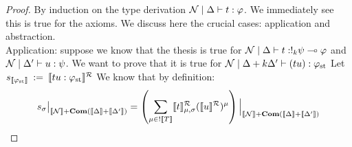 	\begin{proof}
		By induction on the type derivation $\mathcal{N}\mid\Delta\vdash t:\varphi$. We immediately see this is true for the axioms. We discuss here the crucial cases: application and abstraction.\\ 
		Application: suppose we know that the thesis is true for $\mathcal{N}\mid\Delta\vdash t:!_k \psi \multimap \varphi$ and $\mathcal{N}\mid\Delta'\vdash u: \psi$. We want to prove that it is true for $\mathcal{N}\mid\Delta+ k\Delta'\vdash (tu): {\varphi}_{\mathrm{st}}$ Let $s_{\llbracket{\varphi}_{\mathrm{st}}\rrbracket} \: := \: \llbracket tu: {\varphi}_{\mathrm{st}}\rrbracket^{\mathcal{R}}$ We know that by definition:
		$$s_\sigma\big\vert_{\llbracket\mathcal{N}\rrbracket+ \mathbf{Com}(\llbracket\Delta\rrbracket+ \llbracket\Delta'\rrbracket)} = \left( \sum_{\mu \in !{\llbracket T\rrbracket}} \llbracket t\rrbracket^{\mathcal{R}}_{\mu, \sigma} (\llbracket u\rrbracket^{\mathcal{R}})^\mu \right) \Big\vert_{\llbracket\mathcal{N}\rrbracket+ \mathbf{Com}(\llbracket\Delta\rrbracket+ \llbracket\Delta'\rrbracket)} $$


\end{proof}
